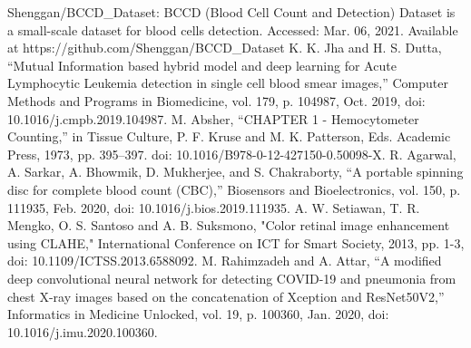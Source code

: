\documentclass[conference]{IEEEtran}
\begin{document}
\begin{thebibliography}{00}
 Shenggan/BCCD_Dataset: BCCD (Blood Cell Count and Detection) Dataset is a small-scale dataset for blood cells detection. Accessed: Mar. 06, 2021. Available at https://github.com/Shenggan/BCCD_Dataset
 K. K. Jha and H. S. Dutta, “Mutual Information based hybrid model and deep learning for Acute Lymphocytic Leukemia detection in single cell blood smear images,” Computer Methods and Programs in Biomedicine, vol. 179, p. 104987, Oct. 2019, doi: 10.1016/j.cmpb.2019.104987.
 M. Absher, “CHAPTER 1 - Hemocytometer Counting,” in Tissue Culture, P. F. Kruse and M. K. Patterson, Eds. Academic Press, 1973, pp. 395–397. doi: 10.1016/B978-0-12-427150-0.50098-X.
 R. Agarwal, A. Sarkar, A. Bhowmik, D. Mukherjee, and S. Chakraborty, “A portable spinning disc for complete blood count (CBC),” Biosensors and Bioelectronics, vol. 150, p. 111935, Feb. 2020, doi: 10.1016/j.bios.2019.111935.
 A. W. Setiawan, T. R. Mengko, O. S. Santoso and A. B. Suksmono, "Color retinal image enhancement using CLAHE," International Conference on ICT for Smart Society, 2013, pp. 1-3, doi: 10.1109/ICTSS.2013.6588092.
 M. Rahimzadeh and A. Attar, “A modified deep convolutional neural network for detecting COVID-19 and pneumonia from chest X-ray images based on the concatenation of Xception and ResNet50V2,” Informatics in Medicine Unlocked, vol. 19, p. 100360, Jan. 2020, doi: 10.1016/j.imu.2020.100360.

\end{thebibliography}
\vspace{12pt}
\color{red}
\end{document}
